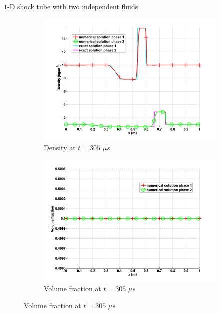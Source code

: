 \documentclass[xcolor=dvipsnames,10pt]{beamer}
\begin{document}
\begin{frame}{$1$-D shock tube with two independent fluids}
\begin{figure}
        \begin{subfigure}[b]{0.37\textwidth}
                \centering
                \includegraphics[width=\textwidth]{../figures/SEM/two_phases_density.png}
                \caption{Density at $t=305$ $\mu s$}
        \end{subfigure}%
        \begin{subfigure}[b]{0.37\textwidth}
                \centering
                \includegraphics[width=\textwidth]{../figures/SEM/two_phases_volume_fraction.png}
                \caption{Volume fraction at $t=305$ $\mu s$}
        \end{subfigure}%
\end{figure}
\end{frame}
\end{document}

